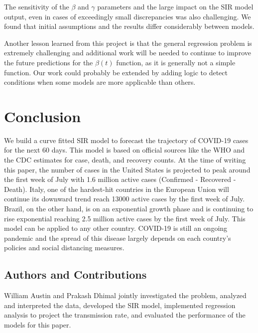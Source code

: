 \documentclass[11pt]{article}
\begin{document}
The sensitivity of the $\beta$ and $\gamma$ parameters and the large impact on the SIR model output, even in cases of exceedingly small discrepancies was also challenging. We found that initial assumptions and the results differ considerably between models. 

Another lesson learned from this project is that the general regression problem is extremely challenging and additional work will be needed to continue to improve the future predictions for the $\beta(t)$ function, as it is generally not a simple function. Our work could probably be extended by adding logic to detect conditions when some models are more applicable than others. 

\section{Conclusion}
We build a curve fitted SIR model to forecast the trajectory of COVID-19 cases for the next 60 days. This model is based on official sources like the WHO and the CDC estimates for case, death, and recovery counts. At the time of writing this paper, the number of cases in the United States is projected to peak around the first week of July with 1.6 million active cases (Confirmed - Recovered - Death). Italy, one of the hardest-hit countries in the European Union will continue its downward trend reach 13000 active cases by the first week of July. Brazil, on the other hand, is on an exponential growth phase and is continuing to rise exponential reaching 2.5 million active cases by the first week of July. This model can be applied to any other country. COVID-19 is still an ongoing pandemic and the spread of this disease largely depends on each country's policies and social distancing measures.


\subsection{Authors and Contributions}
William Austin and Prakash Dhimal jointly investigated the problem, analyzed and interpreted the data, developed the SIR model, implemented regression analysis to project the transmission rate, and evaluated the performance of the models for this paper.

\nocite{epidemic-calculator}





\pagebreak


\listoffigures



\end{document}
